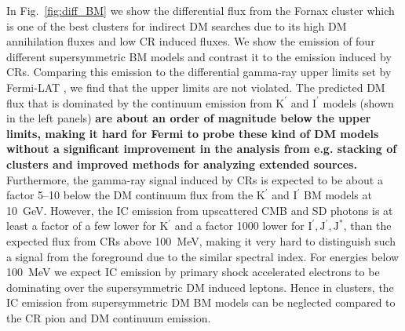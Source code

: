 \documentclass[10pt,aps,pra,reprint,amsmath,amsfonts,amssymb,showpacs,nofootinbib,floatfix]{revtex4-1}
\def\del#1{{}}
\def\C#1{{\bf #1}}
\newcommand{\rmn}{\mathrm}
\newcommand{\Kp}{\rmn{K}^\prime}
\newcommand{\Ip}{\rmn{I}^\prime}
\newcommand{\Js}{\rmn{J}^*}
\newcommand{\Jp}{\rmn{J}^\prime}
\begin{document}
In Fig.~\ref{fig:diff_BM} we show the differential flux from the
Fornax cluster which is one of the best clusters for indirect DM
searches due to its high DM annihilation fluxes and low CR induced
fluxes. We show the emission of four different supersymmetric BM
models and contrast it to the emission induced by CRs. Comparing this
emission to the differential gamma-ray upper limits set by Fermi-LAT
\del{after 18 months of observations \cite{2010ApJ...717L..71A}}, we
find that the upper limits are not violated. The predicted DM flux
that is dominated by the continuum emission from $\Kp$ and $\Ip$
models (shown in the left panels) \C{are about an order of magnitude
  below the upper limits, making it hard for Fermi to probe these kind
  of DM models without a significant improvement in the analysis from
  e.g. stacking of clusters and improved methods for analyzing
  extended sources.}  Furthermore, the gamma-ray signal induced by CRs
is expected to be about a factor 5--10 below the DM continuum flux
from the $\Kp$ and $\Ip$ BM models at 10~GeV. However, the IC emission
from upscattered CMB and SD photons is at least a factor of a few
lower for $\Kp$ and a factor 1000 lower for $\Ip,\Jp,\Js$, than the
expected flux from CRs above 100~MeV, making it very hard to
distinguish such a signal from the foreground due to the similar
spectral index. For energies below 100~MeV we expect IC emission by
primary shock accelerated electrons to be dominating
\cite{2010MNRAS.409..449P} over the supersymmetric DM induced
leptons. Hence in clusters, the IC emission from supersymmetric DM BM
models can be neglected compared to the CR pion and DM continuum emission.
\end{document}

